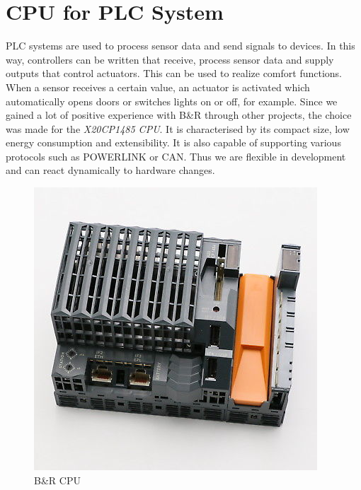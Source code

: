 \section{CPU for PLC System}
PLC systems are used to process sensor data and send signals to devices. In this way, controllers can be written that receive, process sensor data and supply outputs that control actuators. This can be used to realize comfort functions. When a sensor receives a certain value, an actuator is activated which automatically opens doors or switches lights on or off, for example. Since we gained a lot of positive experience with B\&R through other projects, the choice was made for the \textit{X20CP1485 CPU}. It is characterised by its compact size, low energy consumption and extensibility. It is also capable of supporting various protocols such as POWERLINK or CAN. Thus we are flexible in development and can react dynamically to hardware changes.
\newpage
\begin{figure}[h]
	\centering
	\includegraphics[width=.5\textwidth]{images/CostAnalysis/BR-Automation-X20-CP-1484} 
	\caption[B\&R CPU]{B\&R CPU\footnotemark}
	\label{fig:brCPU}
\end{figure}
